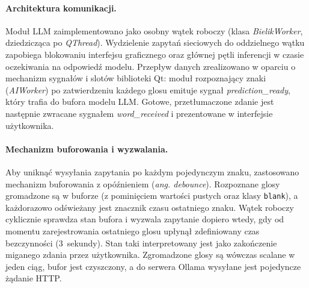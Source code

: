 \documentclass[12pt]{article}
\begin{document}
\paragraph{Architektura komunikacji.}

Moduł LLM zaimplementowano jako osobny wątek roboczy (klasa \textit{BielikWorker}, dziedzicząca po \textit{QThread}). Wydzielenie zapytań sieciowych do oddzielnego wątku zapobiega blokowaniu interfejsu graficznego oraz głównej pętli inferencji w czasie oczekiwania na odpowiedź modelu. Przepływ danych zrealizowano w oparciu o mechanizm sygnałów i slotów biblioteki Qt: moduł rozpoznający znaki (\textit{AIWorker}) po zatwierdzeniu każdego glosu emituje sygnał \textit{prediction\_ready}, który trafia do bufora modelu LLM. Gotowe, przetłumaczone zdanie jest następnie zwracane sygnałem \textit{word\_received} i prezentowane w interfejsie użytkownika.

\paragraph{Mechanizm buforowania i wyzwalania.}
Aby uniknąć wysyłania zapytania po każdym pojedynczym znaku, zastosowano mechanizm buforowania z opóźnieniem (\textit{ang. debounce}). Rozpoznane glosy gromadzone są w buforze (z pominięciem wartości pustych oraz klasy \texttt{blank}), a każdorazowo odświeżany jest znacznik czasu ostatniego znaku. Wątek roboczy cyklicznie sprawdza stan bufora i wyzwala zapytanie dopiero wtedy, gdy od momentu zarejestrowania ostatniego glosu upłynął zdefiniowany czas bezczynności (3~sekundy). Stan taki interpretowany jest jako zakończenie miganego zdania przez użytkownika. Zgromadzone glosy są wówczas scalane w jeden ciąg, bufor jest czyszczony, a do serwera Ollama wysyłane jest pojedyncze żądanie HTTP.
\end{document}
